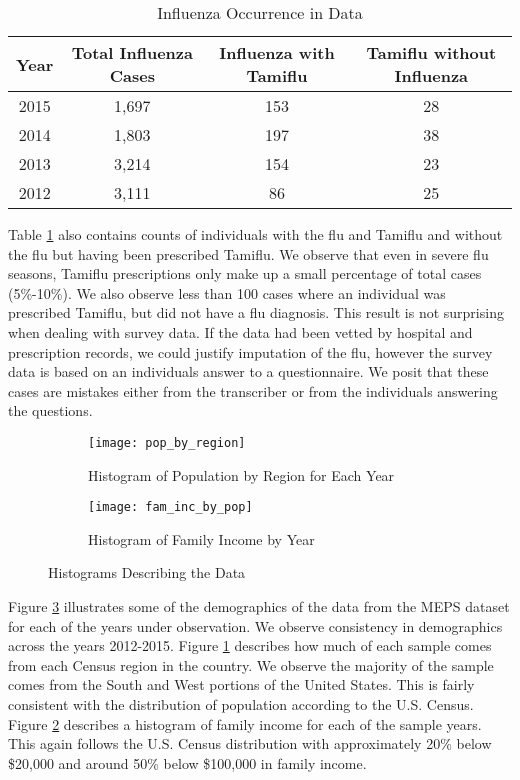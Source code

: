 \documentclass[twoside,11pt]{article}
\begin{document}
\begin{table}[h]
\centering
\caption{Influenza Occurrence in Data}
\label{flu_counts}
\begin{tabular}{cccc}
\hline
Year & Total Influenza Cases & Influenza with Tamiflu & Tamiflu without Influenza\\ \hline
2015 & 1,697 & 153 & 28\\
2014 & 1,803 & 197 & 38\\
2013 & 3,214 & 154 & 23\\
2012 & 3,111 & 86 & 25\\
\end{tabular}
\end{table}

Table \ref{flu_counts} also contains counts of individuals with the flu and Tamiflu and without the flu but having been prescribed Tamiflu.  We observe that even in severe flu seasons, Tamiflu prescriptions only make up a small percentage of total cases (5\%-10\%).  We also observe less than 100 cases where an individual was prescribed Tamiflu, but did not have a flu diagnosis.  This result is not surprising when dealing with survey data.  If the data had been vetted by hospital and prescription records, we could justify imputation of the flu, however the survey data is based on an individuals answer to a questionnaire. We posit that these cases are mistakes either from the transcriber or from the individuals answering the questions.  

\begin{figure}[h]
\centering
\begin{subfigure}{.4\textwidth}
  \centering
  \texttt{[image: pop\_by\_region]}
  \caption{Histogram of Population by Region for Each Year}
  \label{fig:hist_by_region}
\end{subfigure}%
\begin{subfigure}{.5\textwidth}
  \centering
  \texttt{[image: fam\_inc\_by\_pop]}
  \caption{Histogram of Family Income by Year}
  \label{fig:hist_by_inc}
\end{subfigure}
\caption{Histograms Describing the Data}
\label{fig:data_desc}
\end{figure}

Figure \ref{fig:data_desc} illustrates some of the demographics of the data from the MEPS dataset for each of the years under observation.  We observe consistency in demographics across the years 2012-2015.  Figure \ref{fig:hist_by_region} describes how much of each sample comes from each Census region in the country.  We observe the majority of the sample comes from the South and West portions of the United States.  This is fairly consistent with the distribution of population according to the U.S. Census.  Figure \ref{fig:hist_by_inc} describes a histogram of family income for each of the sample years.  This again follows the U.S. Census distribution with approximately 20\% below \$20,000 and around 50\% below \$100,000 in family income.     
\end{document}
